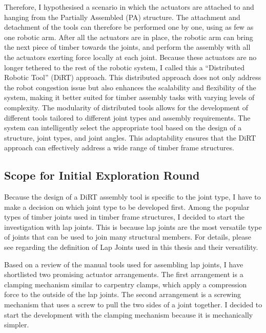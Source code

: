 Therefore, I hypothesised a scenario in which the actuators are attached to and hanging from the Partially Assembled (PA) structure. The attachment and detachment of the tools can therefore be performed one by one, using as few as one robotic arm. After all the actuators are in place, the robotic arm can bring the next piece of timber towards the joints, and perform the assembly with all the actuators exerting force locally at each joint. Because these actuators are no longer tethered to the rest of the robotic system, I called this a “Distributed Robotic Tool” (DiRT) approach. 
This distributed approach does not only address the robot congestion issue but also enhances the scalability and flexibility of the system, making it better suited for timber assembly tasks with varying levels of complexity. The modularity of distributed tools allows for the development of different tools tailored to different joint types and assembly requirements. The system can intelligently select the appropriate tool based on the design of a structure, joint types, and joint angles. This adaptability ensures that the DiRT approach can effectively address a wide range of timber frame structures.

\subsection{Scope for Initial Exploration Round}
\label{subsection:exploration-1-scope-for-initial-exploration-round}

Because the design of a DiRT assembly tool is specific to the joint type, I have to make a decision on which joint type to be developed first. Among the popular types of timber joints used in timber frame structures, I decided to start the investigation with lap joints. This is because lap joints are the most versatile type of joints that can be used to join many structural members. For details, please see  regarding the definition of Lap Joints used in this thesis and their versatility.

Based on a review of the manual tools used for assembling lap joints, I have shortlisted two promising actuator arrangements. The first arrangement is a clamping mechanism similar to carpentry clamps, which apply a compression force to the outside of the lap joints. The second arrangement is a screwing mechanism that uses a screw to pull the two sides of a joint together. I decided to start the development with the clamping mechanism because it is mechanically simpler. 

